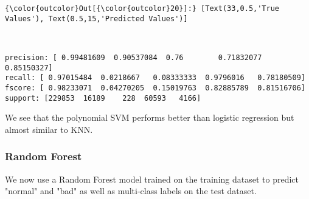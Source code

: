 \documentclass[11pt]{article}
\begin{document}
\begin{Verbatim}[commandchars=\\\{\}]
{\color{outcolor}Out[{\color{outcolor}20}]:} [Text(33,0.5,'True Values'), Text(0.5,15,'Predicted Values')]
\end{Verbatim}
            
    \begin{center}
    \end{center}
    { \hspace*{\fill} \\}
    
    \begin{Verbatim}[commandchars=\\\{\}]
precision: [ 0.99481609  0.90537084  0.76        0.71832077  0.85150327]
recall: [ 0.97015484  0.0218667   0.08333333  0.9796016   0.78180509]
fscore: [ 0.98233071  0.04270205  0.15019763  0.82885789  0.81516706]
support: [229853  16189    228  60593   4166]

    \end{Verbatim}

    We see that the polynomial SVM performs better than logistic regression
but almost similar to KNN.

    \subsubsection{Random Forest}\label{random-forest}

We now use a Random Forest model trained on the training dataset to
predict "normal" and "bad" as well as multi-class labels on the test
dataset.
\end{document}
